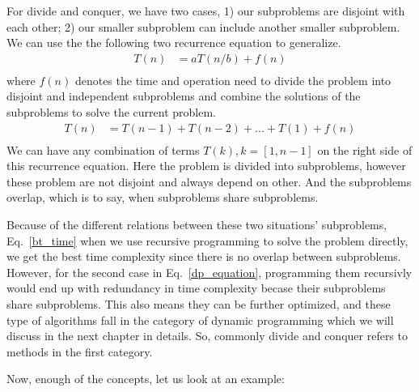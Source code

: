 \documentclass[../algorithms.tex]{subfiles}
\begin{document}
For divide and conquer, we have two cases, 1) our subproblems are disjoint with each other; 2) our smaller subproblem can include another smaller subproblem. We can use the the following two recurrence equation to generalize.
\begin{equation} \label{bt_time}
\begin{split}
T(n) & = aT(n/b) + f(n)\\
\end{split}
\end{equation}
where $f(n)$ denotes the time and operation need to divide the problem into disjoint and independent subproblems and combine the solutions of the subproblems to solve the current problem. 
\begin{equation} \label{dp_equation}
\begin{split}
T(n) &= T(n-1) + T(n-2) +...+T(1) + f(n)\\
\end{split}
\end{equation} 
 We can have any combination of terms $T(k), k = [1, n-1]$ on the right side of this recurrence equation. Here the problem is divided into subproblems, however these problem are not disjoint and always depend on other. And the subproblems overlap, which is to say, when subproblems share subproblems. 
 
 Because of the different relations between these two situations' subproblems, Eq.~\ref{bt_time} when we use recursive programming to solve the problem directly, we get the best time complexity since there is no overlap between subproblems. However, for the second case in Eq.~\ref{dp_equation}, programming them recursivly would end up with redundancy in time complexity becase their subproblems share subproblems. This also means they can be further optimized, and these type of algorithms fall in the category of dynamic programming which we will discuss in the next chapter in details. So, commonly divide and conquer refers to methods in the first category. 
 
 Now, enough of the concepts, let us look at an example:
 
\end{document}
